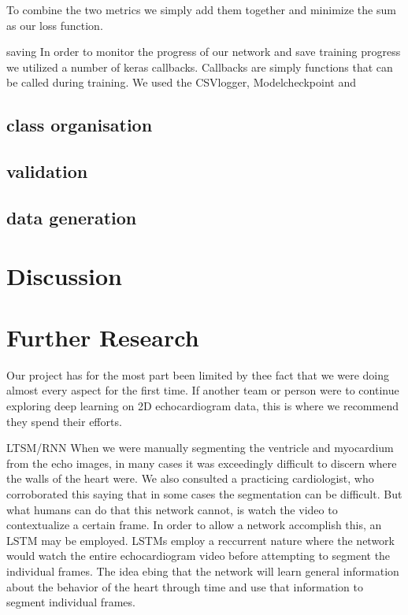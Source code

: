 \documentclass[12pt]{article}
\begin{document}
To combine the two metrics we simply add them together and minimize the sum as our loss function.

saving
In order to monitor the progress of our network and save training progress we utilized a number of keras callbacks.
Callbacks are simply functions that can be called during training.
We used the CSVlogger, Modelcheckpoint and

\subsection{class organisation}
\subsection{validation}
\subsection{data generation}



\section{Discussion}
\section{Further Research}
Our project has for the most part been limited by thee fact that we were doing almost every aspect for the first time.
If another team or person were to continue exploring deep learning on 2D echocardiogram data, this is where we recommend they spend their efforts.

LTSM/RNN
When we were manually segmenting the ventricle and myocardium from the echo images, in many cases it was exceedingly difficult to discern where the walls of the heart were.
We also consulted a practicing cardiologist, who corroborated this saying that in some cases the segmentation can be difficult.
But what humans  can do that this network cannot, is watch the video to contextualize a certain frame.
In order to allow a network accomplish this, an LSTM may be employed.
LSTMs employ a reccurrent nature where the network would watch the entire echocardiogram video before attempting to segment the individual frames.
The idea ebing that the network will learn general information about the behavior of the heart through time and use that information to segment individual frames.
\end{document}
